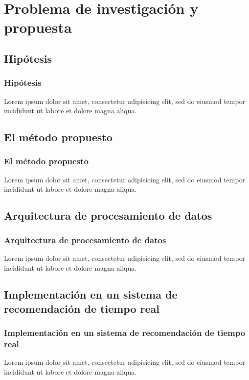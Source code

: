 \section{Problema de investigación y propuesta}

\subsection{Hipótesis}
\begin{frame}[allowframebreaks]
	\frametitle{Hipótesis}
	Lorem ipsum dolor sit amet, consectetur adipisicing elit, sed do eiusmod tempor incididunt ut labore et dolore magna aliqua.
\end{frame}

\subsection{El método propuesto}
\begin{frame}[allowframebreaks]
	\frametitle{El método propuesto}
	Lorem ipsum dolor sit amet, consectetur adipisicing elit, sed do eiusmod tempor incididunt ut labore et dolore magna aliqua.
\end{frame}

\subsection{Arquitectura de procesamiento de datos}
\begin{frame}[allowframebreaks]
	\frametitle{Arquitectura de procesamiento de datos}
	Lorem ipsum dolor sit amet, consectetur adipisicing elit, sed do eiusmod tempor incididunt ut labore et dolore magna aliqua.
\end{frame}


\subsection{Implementación en un sistema de recomendación de tiempo real}
\begin{frame}[allowframebreaks]
	\frametitle{Implementación en un sistema de recomendación de tiempo real}
	Lorem ipsum dolor sit amet, consectetur adipisicing elit, sed do eiusmod tempor incididunt ut labore et dolore magna aliqua.
\end{frame}